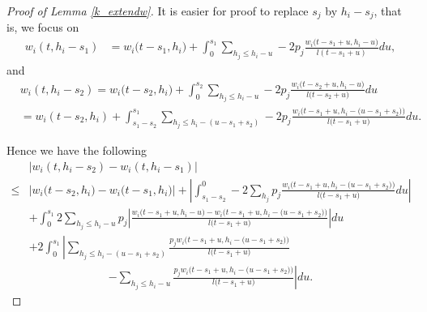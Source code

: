 \documentclass[10pt,a4paper]{amsart}
\begin{document}
\begin{proof}[Proof of Lemma \ref{k_extendw}]
It is easier for proof to replace $s_j$ by $h_i-s_j$, that is, we focus on
\begin{align*} 
w_i(t,h_i-s_1)&= w_i\big(t-s_1,h_i\big)+\int_{0}^{s_1} \sum_{h_j\leq h_i-u} -2p_j\frac{w_i\big(t-s_1+u,h_i-u\big)}{l(t-s_1+u)}du,
\end{align*} 
and
{
\begin{align*} 
&w_i(t,h_i-s_2)= w_i\big(t-s_2,h_i\big)+\int_{0}^{s_2} \sum_{h_j\leq h_i-u} -2p_j\frac{w_i\big(t-s_2+u,h_i-u\big)}{l\big(t-s_2+u\big)}du\\
&=w_i(t-s_2,h_i)+\int_{s_1-s_2}^{s_1} \sum_{h_j\leq h_i-(u-s_1+s_2)} -2p_j\frac{w_i\big(t-s_1+u,h_i-\big(u-s_1+s_2\big)\big)}{l\big(t-s_1+u\big)} du.
\end{align*} }

Hence we have the following
{
\begin{align} 
&\left|w_i(t,h_i-s_2)-w_i(t,h_i-s_1)\right|\nonumber\\
\leq& \left|w_i\big(t-s_2,h_i\big)- w_i\big(t-s_1,h_i\big)\right|
+\left|\int_{s_1-s_2}^0-2\sum_{h_j} p_j\frac{w_i\big(t-s_1+u,h_i-\big(u-s_1+s_2\big)\big)}{l\big(t-s_1+u\big)}du\right|\nonumber\\
&+\int_{0}^{s_1}2\sum_{h_j\leq h_i-u}p_j \left|\frac{w_i\big(t-s_1+u,h_i-u\big)-w_i\big(t-s_1+u,h_i-\big(u-s_1+s_2\big)\big)}{l\big(t-s_1+u\big)}\right|du\nonumber\\
&+2\int_{0}^{s_1} 
\left|
\sum_{h_j\leq h_i-(u-s_1+s_2)} \frac{p_j w_i\big(t-s_1+u,h_i-\big(u-s_1+s_2\big)\big)}{l\big(t-s_1+u\big)} \right.\nonumber\\
&\quad\quad\quad\quad\quad\quad\quad\left.-\sum_{h_j\leq h_i-u} \frac{p_j w_i\big(t-s_1+u,h_i-\big(u-s_1+s_2\big)\big)}{l\big(t-s_1+u\big)} 
\right|du .
\label{kpw_12_0}
\end{align} }



\end{proof}
\end{document}
